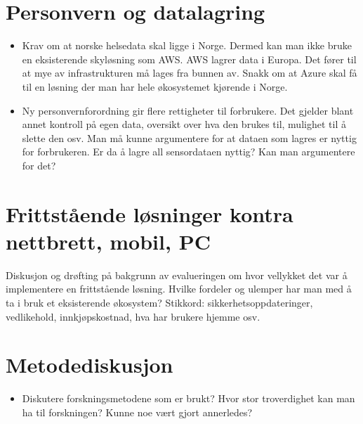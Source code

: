 \section{Personvern og datalagring}\label{personvern-og-datalagring}

\begin{itemize}
\tightlist
\item
  Krav om at norske helsedata skal ligge i Norge. Dermed kan man ikke
  bruke en eksisterende skyløsning som AWS. AWS lagrer data i Europa.
  Det fører til at mye av infrastrukturen må lages fra bunnen av. Snakk
  om at Azure skal få til en løsning der man har hele økosystemet
  kjørende i Norge.
\item
  Ny personvernforordning gir flere rettigheter til forbrukere. Det
  gjelder blant annet kontroll på egen data, oversikt over hva den
  brukes til, mulighet til å slette den osv. Man må kunne argumentere
  for at dataen som lagres er nyttig for forbrukeren. Er da å lagre all
  sensordataen nyttig? Kan man argumentere for det?
\end{itemize}

\section{Frittstående løsninger kontra nettbrett, mobil,
PC}\label{frittstuxe5ende-luxf8sninger-kontra-nettbrett-mobil-pc}

Diskusjon og drøfting på bakgrunn av evalueringen om hvor vellykket det
var å implementere en frittstående løsning. Hvilke fordeler og ulemper
har man med å ta i bruk et eksisterende økosystem? Stikkord:
sikkerhetsoppdateringer, vedlikehold, innkjøpskostnad, hva har brukere
hjemme osv.

\section{Metodediskusjon}\label{metodediskusjon}

\begin{itemize}
\tightlist
\item
  Diskutere forskningsmetodene som er brukt? Hvor stor troverdighet kan
  man ha til forskningen? Kunne noe vært gjort annerledes?
\end{itemize}

